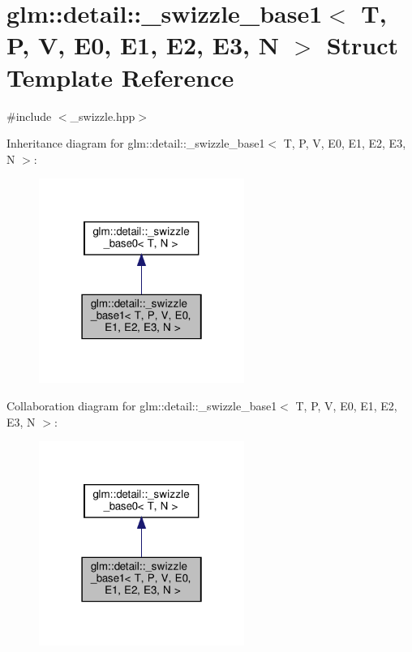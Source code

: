 \hypertarget{structglm_1_1detail_1_1__swizzle__base1}{}\section{glm\+:\+:detail\+:\+:\+\_\+swizzle\+\_\+base1$<$ T, P, V, E0, E1, E2, E3, N $>$ Struct Template Reference}
\label{structglm_1_1detail_1_1__swizzle__base1}


{\ttfamily \#include $<$\+\_\+swizzle.\+hpp$>$}



Inheritance diagram for glm\+:\+:detail\+:\+:\+\_\+swizzle\+\_\+base1$<$ T, P, V, E0, E1, E2, E3, N $>$\+:\nopagebreak
\begin{figure}[H]
\begin{center}
\leavevmode
\includegraphics[width=190pt]{structglm_1_1detail_1_1__swizzle__base1__inherit__graph}
\end{center}
\end{figure}


Collaboration diagram for glm\+:\+:detail\+:\+:\+\_\+swizzle\+\_\+base1$<$ T, P, V, E0, E1, E2, E3, N $>$\+:\nopagebreak
\begin{figure}[H]
\begin{center}
\leavevmode
\includegraphics[width=190pt]{structglm_1_1detail_1_1__swizzle__base1__coll__graph}
\end{center}
\end{figure}
